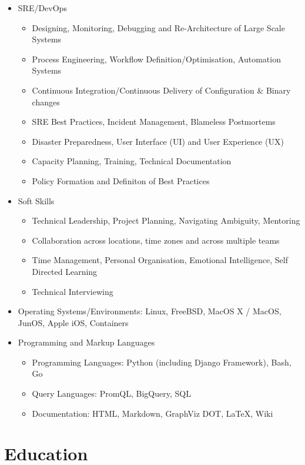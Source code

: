 \documentclass[a4paper, 10pt] {article}
\begin{document}
\begin{itemize}[itemsep=2pt,parsep=2pt]
\item SRE/DevOps
  \begin{itemize}[itemsep=2pt,parsep=2pt]
  \item Designing, Monitoring, Debugging and Re-Architecture of Large Scale Systems
  \item Process Engineering, Workflow Definition/Optimisation, Automation Systems
  \item Continuous Integration/Continuous Delivery of Configuration \& Binary changes
  \item SRE Best Practices, Incident Management, Blameless Postmortems
  \item Disaster Preparedness, User Interface (UI) and User Experience (UX)
  \item Capacity Planning, Training, Technical Documentation
  \item Policy Formation and Definiton of Best Practices
  \end{itemize}
\item Soft Skills
  \begin{itemize}[itemsep=2pt,parsep=2pt]
  \item Technical Leadership, Project Planning, Navigating Ambiguity, Mentoring
  \item Collaboration across locations, time zones and across multiple teams
  \item Time Management, Personal Organisation, Emotional Intelligence, Self Directed Learning
  \item Technical Interviewing
  \end{itemize}
  \item Operating Systems/Environments: Linux, FreeBSD, MacOS X / MacOS, JunOS, Apple iOS, Containers
\item Programming and Markup Languages
  \begin{itemize}[itemsep=2pt,parsep=2pt]
  \item Programming Languages: Python (including Django Framework), Bash, Go
  \item Query Languages: PromQL, BigQuery, SQL
  \item Documentation: HTML, Markdown, GraphViz DOT, \LaTeX, Wiki
  \end{itemize}
\end{itemize}  

\hrulefill

\section*{Education}
\end{document}

